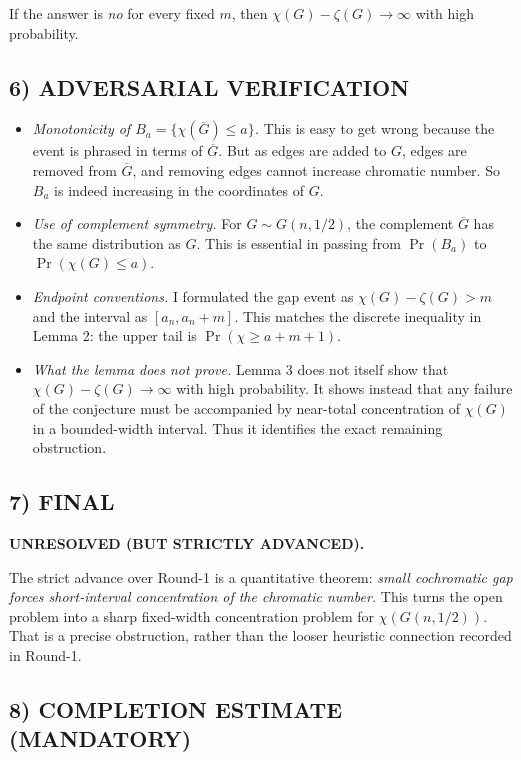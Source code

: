 If the answer is \emph{no} for every fixed $m$, then $\chi(G)-\zeta(G)\to\infty$ with high probability.

\subsection*{6) ADVERSARIAL VERIFICATION}

\begin{itemize}
\item \emph{Monotonicity of $B_a=\{\chi(\overline G)\le a\}$.}
This is easy to get wrong because the event is phrased in terms of $\overline G$.
But as edges are added to $G$, edges are removed from $\overline G$, and removing edges cannot increase
chromatic number. So $B_a$ is indeed increasing in the coordinates of $G$.

\item \emph{Use of complement symmetry.}
For $G\sim G(n,1/2)$, the complement $\overline G$ has the same distribution as $G$.
This is essential in passing from $\Pr(B_a)$ to $\Pr(\chi(G)\le a)$.

\item \emph{Endpoint conventions.}
I formulated the gap event as $\chi(G)-\zeta(G)>m$ and the interval as $[a_n,a_n+m]$.
This matches the discrete inequality in Lemma 2:
the upper tail is $\Pr(\chi\ge a+m+1)$.

\item \emph{What the lemma does \emph{not} prove.}
Lemma 3 does not itself show that $\chi(G)-\zeta(G)\to\infty$ with high probability.
It shows instead that any failure of the conjecture must be accompanied by near-total concentration
of $\chi(G)$ in a bounded-width interval.
Thus it identifies the exact remaining obstruction.
\end{itemize}

\subsection*{7) FINAL}

\textbf{UNRESOLVED (BUT STRICTLY ADVANCED).}

The strict advance over Round-1 is a quantitative theorem:
\emph{small cochromatic gap forces short-interval concentration of the chromatic number.}
This turns the open problem into a sharp fixed-width concentration problem for $\chi(G(n,1/2))$.
That is a precise obstruction, rather than the looser heuristic connection recorded in Round-1.

\subsection*{8) COMPLETION ESTIMATE (MANDATORY)}

